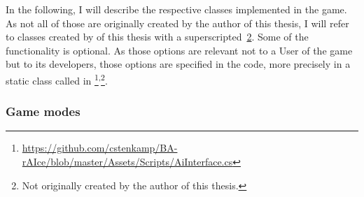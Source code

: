 In the following, I will describe the respective classes implemented in the game. As not all of those are originally created by the author of this thesis, I will refer to classes created by \leon of this thesis with a superscripted~\ref{byLeon}. Some of the functionality is optional. As those options are relevant not to a User of the game but to its developers, those options are specified in the code, more precisely in a static class called  in \footnote{\url{https://github.com/cstenkamp/BA-rAIce/blob/master/Assets/Scripts/AiInterface.cs}}\textsuperscript{,}\footnote{\label{byLeon} Not originally created by the author of this thesis.}.\\



\newcommand{\byLeon}{\textsuperscript{,\ref{byLeon}}{ }}

\subsubsection{Game modes}

